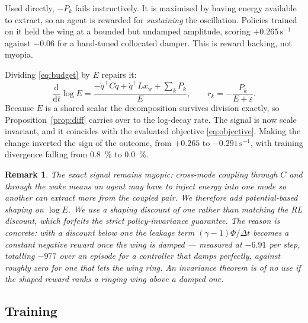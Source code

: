 \documentclass[preprint,11pt,authoryear]{elsarticle}
\newtheorem{remark}{Remark}
\begin{document}
Used directly, $-P_k$ fails instructively. It is maximised by having energy
available to extract, so an agent is rewarded for \emph{sustaining} the
oscillation. Policies trained on it held the wing at a bounded but undamped
amplitude, scoring $+0.265\,\mathrm{s}^{-1}$ against $-0.06$ for a hand-tuned
collocated damper. This is reward hacking, not myopia.

Dividing \eqref{eq:budget} by $E$ repairs it:
\begin{equation}
\frac{\mathrm{d}}{\mathrm{d}t}\log E
= \frac{-\dot q^{\top} C \dot q + \dot q^{\top} L x_{\mathrm{w}} + \sum_k P_k}{E},
\qquad
r_k = -\frac{P_k}{E + \varepsilon}.
\label{eq:logcredit}
\end{equation}
Because $E$ is a shared scalar the decomposition survives division exactly, so
Proposition~\ref{prop:diff} carries over to the log-decay rate. The signal is now
scale invariant, and it coincides with the evaluated objective
\eqref{eq:objective}. Making the change inverted the sign of the outcome, from
$+0.265$ to $-0.291\,\mathrm{s}^{-1}$, with training divergence falling from
\SI{0.8}{\percent} to \SI{0.0}{\percent}.

\begin{remark}
The exact signal remains myopic: cross-mode coupling through $C$ and through the
wake means an agent may have to inject energy into one mode so another can
extract more from the coupled pair. We therefore add potential-based shaping
\citep{ng1999shaping} on $\log E$. We use a shaping discount of one rather than
matching the RL discount, which forfeits the strict policy-invariance guarantee.
The reason is concrete: with a discount below one the leakage term
$(\gamma-1)\Phi/\Delta t$ becomes a constant negative reward once the wing is
damped --- measured at $-6.91$ per step, totalling $-977$ over an episode for a
controller that damps perfectly, against roughly zero for one that lets the wing
ring. An invariance theorem is of no use if the shaped reward ranks a ringing
wing above a damped one.
\end{remark}

\subsection{Training}
\end{document}
